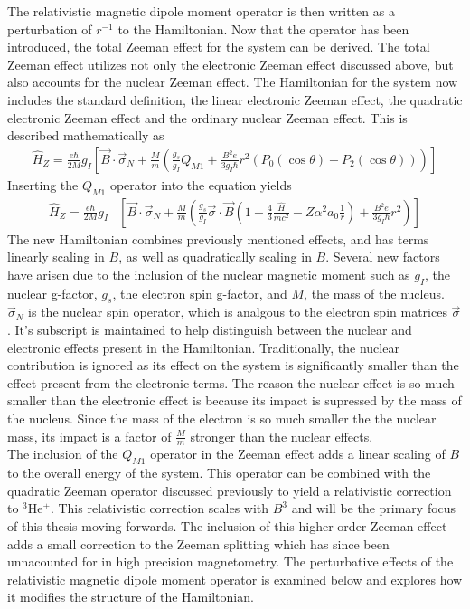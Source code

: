             \noindent The relativistic magnetic dipole moment operator is then written as a perturbation of $r^{-1}$ to the Hamiltonian. Now that the operator has been introduced, the total Zeeman effect for the system can be derived. The total Zeeman effect utilizes not only the electronic Zeeman effect discussed above, but also accounts for the nuclear Zeeman effect. The Hamiltonian for the system now includes the standard definition, the linear electronic Zeeman effect, the quadratic electronic Zeeman effect and the ordinary nuclear Zeeman effect. This is described mathematically as 
            \begin{align}
                \hat{H}_Z = \frac{e\hbar}{2M} g_I  \left[ \vec{B} \cdot \vec{\sigma}_N + \frac{M}{m} \left(\frac{g_s}{g_I} Q_{M1} + \frac{B^2 e}{3g_I \hbar} r^2 \left( P_0(\cos \theta) - P_2(\cos\theta) \right) \right) \right]
            \end{align}
            \noindent Inserting the $Q_{M1}$ operator into the equation yields 
            \small         
            \begin{align}
                \hat{H}_Z = \frac{e\hbar}{2M} g_I  &\left[ \vec{B} \cdot \vec{\sigma}_N + \frac{M}{m} \left(\frac{g_s}{g_I} \vec{\sigma} \cdot \vec{B} \left(1 - \frac{4}{3}\frac{\hat{H}}{mc^2} - Z \alpha^2 a_0 \frac{1}{r} \right) + \frac{B^2 e}{3g_I \hbar} r^2 \right) \right]
            \end{align}
            \normalsize
            \noindent The new Hamiltonian combines previously mentioned effects, and has terms linearly scaling in $B$, as well as quadratically scaling in $B$. Several new factors have arisen due to the inclusion of the nuclear magnetic moment such as $g_I$, the nuclear g-factor, $g_s$, the electron spin g-factor, and $M$, the mass of the nucleus. $\vec{\sigma}_N$ is the nuclear spin operator, which is analgous to the electron spin matrices $\vec{\sigma}$. It's subscript is maintained to help distinguish between the nuclear and electronic effects present in the Hamiltonian. Traditionally, the nuclear contribution is ignored as its effect on the system is significantly smaller than the effect present from the electronic terms. The reason the nuclear effect is so much smaller than the electronic effect is because its impact is supressed by the mass of the nucleus. Since the mass of the electron is so much smaller the the nuclear mass, its impact is a factor of $\frac{M}{m}$ stronger than the nuclear effects.\\

            The inclusion of the $Q_{M1}$ operator in the Zeeman effect adds a linear scaling of $B$ to the overall energy of the system. This operator can be combined with the quadratic Zeeman operator discussed previously to yield a relativistic correction to $^3$He$^+$. This relativistic correction scales with $B^3$ and will be the primary focus of this thesis moving forwards. The inclusion of this higher order Zeeman effect adds a small correction to the Zeeman splitting which has since been unnacounted for in high precision magnetometry. The perturbative effects of the relativistic magnetic dipole moment operator is examined below and explores how it modifies the structure of the Hamiltonian. \\
            
